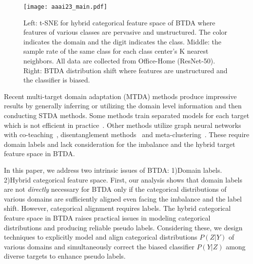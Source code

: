 \documentclass[letterpaper]{article} \usepackage{aaai23}  \usepackage{times}  \usepackage{helvet}  \usepackage{courier}  \usepackage[hyphens]{url}  \usepackage{graphicx} \urlstyle{rm} \def\UrlFont{\rm}  \usepackage{natbib}  \usepackage{caption} \frenchspacing  \setlength{\pdfpagewidth}{8.5in}  \setlength{\pdfpageheight}{11in}
\begin{document}
\begin{figure*}[t] \centering \texttt{[image: aaai23\_main.pdf]} \caption{Left: t-SNE for hybrid categorical feature space of BTDA where features of various classes are pervasive and unstructured. The color indicates the domain and the digit indicates the class. Middle: the sample rate of the same class for each class center's K nearest neighbors. All data are collected from Office-Home (ResNet-50). Right: BTDA distribution shift where features are unstructured and the classifier is biased.} 
\label{btda_hybrid_feat} \end{figure*}

Recent multi-target domain adaptation (MTDA) methods produce impressive results by generally inferring or utilizing the domain level information and then conducting STDA methods. Some methods train separated models for each target which is not efficient in practice~\cite{saporta2021multi,isobe2021multi,nguyen2021unsupervised,saporta2021multi}. Other methods utilize graph neural networks with co-teaching~\cite{roy2021curriculum}, disentanglement methods~\cite{gholami2020unsupervised} and meta-clustering~\cite{chen2019blending}. These require domain labels and lack consideration for the imbalance and the hybrid target feature space in BTDA.

In this paper, we address two intrinsic issues of BTDA: 1)Domain labels. 2)Hybrid categorical feature space. First, our analysis shows that domain labels are not \textit{directly} necessary for BTDA only if the categorical distributions of various domains are sufficiently aligned even facing the imbalance and the label shift. However, categorical alignment requires labels. The hybrid categorical feature space in BTDA raises practical issues in modeling categorical distributions and producing reliable pseudo labels. Considering these, we design techniques to explicitly model and align categorical distributions $P(Z|Y)$ of various domains and simultaneously correct the biased classifier $P(Y|Z)$ among diverse targets to enhance pseudo labels.
\end{document}
